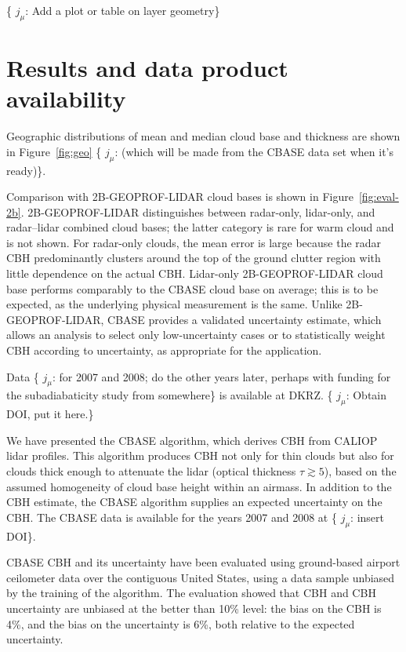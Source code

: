 \documentclass[essd,manuscript]{copernicus}\usepackage[]{graphicx}\usepackage[]{color}
\newcommand{\hlnum}[1]{\textcolor[rgb]{0.686,0.059,0.569}{#1}}%
\newcommand\comment[2]{\{\hlnum{ \textit{#1}: #2}\}}
\newcommand\commentjm[1]{\comment{$j_\mu$}{#1}}
\begin{document}
\commentjm{Add a plot or table on layer geometry}

\section{Results and data product availability}
\label{sec:results}

Geographic distributions of mean and median cloud base and thickness are shown
in Figure~\ref{fig:geo} \commentjm{(which will be made from the CBASE data set
  when it's ready)}.

Comparison with 2B-GEOPROF-LIDAR cloud bases is shown in
Figure~\ref{fig:eval-2b}.   2B-GEOPROF-LIDAR distinguishes between radar-only,
lidar-only, and radar--lidar combined cloud bases; the latter category is rare
for warm cloud and is not shown.  For radar-only clouds, the mean error is large
because the radar CBH predominantly clusters around the top of the
ground clutter region with little dependence on the actual CBH.
Lidar-only 2B-GEOPROF-LIDAR cloud base performs comparably to the CBASE cloud
base on average; this is to be expected, as the underlying physical measurement
is the same.   Unlike 2B-GEOPROF-LIDAR, CBASE provides a validated uncertainty
estimate, which allows an analysis to select only
low-uncertainty cases or to statistically weight CBH according to
uncertainty, as appropriate for the application.

Data \commentjm{for 2007 and 2008; do the other years later, perhaps with
  funding for the subadiabaticity study from somewhere} is available at DKRZ.
\commentjm{Obtain DOI, put it here.}

\conclusions
\label{sec:conclusions}

We have presented the CBASE algorithm, which derives CBH from
CALIOP lidar profiles.  This algorithm produces CBH not only for
thin clouds but also for clouds thick enough to attenuate the lidar (optical
thickness $\tau \gtrsim 5$), based on the assumed homogeneity of cloud base
height within an airmass.  In addition to the CBH estimate, the
CBASE algorithm supplies an expected uncertainty on the CBH.
The CBASE data is available for the years 2007 and 2008 at \commentjm{insert DOI}.

CBASE CBH and its uncertainty have been evaluated using
ground-based airport ceilometer data over the contiguous United States, using a
data sample unbiased by the training of the algorithm.  The evaluation showed that
CBH and CBH uncertainty are unbiased at the better
than 10\% level: the bias on the CBH is %
4\%,
and the bias on the uncertainty is %
6\%, both relative to the expected uncertainty.
\end{document}
